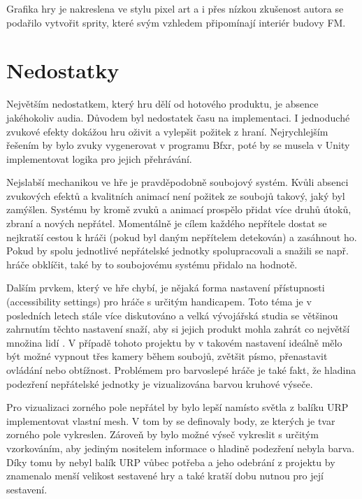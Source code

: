 \documentclass[FM,Proj]{tulthesis}
\begin{document}
	Grafika hry je nakreslena ve stylu pixel art a i přes nízkou zkušenost autora se podařilo vytvořit sprity, které svým vzhledem připomínají interiér budovy FM.
	
	\section{Nedostatky} %
	
	Největším nedostatkem, který hru dělí od hotového produktu, je absence jakéhokoliv audia. Důvodem byl nedostatek času na implementaci. I jednoduché zvukové efekty dokážou hru oživit a vylepšit požitek z hraní. Nejrychlejším řešením by bylo zvuky vygenerovat v programu Bfxr, poté by se musela v Unity implementovat logika pro jejich přehrávání.
	
	Nejslabší mechanikou ve hře je pravděpodobně soubojový systém. Kvůli absenci zvukových efektů a kvalitních animací není požitek ze soubojů takový, jaký byl zamýšlen. Systému by kromě zvuků a animací prospělo přidat více druhů útoků, zbraní a nových nepřátel. Momentálně je cílem každého nepřítele dostat se nejkratší cestou k hráči (pokud byl daným nepřítelem detekován) a zasáhnout ho. Pokud by spolu jednotlivé nepřátelské jednotky spolupracovali a snažili se např. hráče obklíčit, také by to soubojovému systému přidalo na hodnotě.
	
	Dalším prvkem, který ve hře chybí, je nějaká forma nastavení přístupnosti (accessibility settings) pro hráče s určitým handicapem. Toto téma je v posledních letech stále více diskutováno a velká vývojářská studia se většinou zahrnutím těchto nastavení snaží, aby si jejich produkt mohla zahrát co největší množina lidí \cite{disability}. V případě tohoto projektu by v takovém nastavení ideálně mělo být možné vypnout třes kamery během soubojů, zvětšit písmo, přenastavit ovládání nebo obtížnost. Problémem pro barvoslepé hráče je také fakt, že hladina podezření nepřátelské jednotky je vizualizována barvou kruhové výseče.
	
	
	Pro vizualizaci zorného pole nepřátel by bylo lepší namísto světla z balíku URP implementovat vlastní mesh. V tom by se definovaly body, ze kterých je tvar zorného pole vykreslen. Zároveň by bylo možné výseč vykreslit s určitým vzorkováním, aby jediným nositelem informace o hladině podezření nebyla barva. Díky tomu by nebyl balík URP vůbec potřeba a jeho odebrání z projektu by znamenalo menší velikost sestavené hry a také kratší dobu nutnou pro její sestavení.
	
\end{document}
